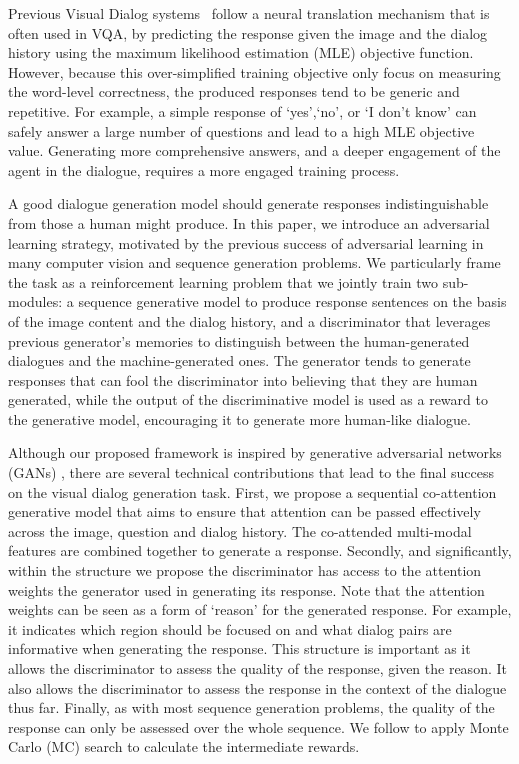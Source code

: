\documentclass[10pt,twocolumn,letterpaper]{article}
\begin{document}
Previous Visual Dialog systems~\cite{das2016visual} follow a neural translation mechanism that is often used in VQA, by predicting the response given the image and the dialog history using the maximum likelihood estimation (MLE) objective function. However, because this over-simplified training objective only focus on measuring the word-level correctness, the produced responses tend to be generic and repetitive. For example, a simple response of `yes',`no', or `I don't know' can safely answer a large number of questions and lead to a high MLE objective value.
Generating more comprehensive answers, and a deeper engagement of the agent in the dialogue, requires a more engaged training process.

A good dialogue generation model should generate responses indistinguishable from those a human might produce. In this paper, we introduce an adversarial learning strategy, 
motivated by the previous success of adversarial learning in many computer vision  \cite{chen2016infogan,radford2015unsupervised} and sequence generation \cite{dai2017towards, yu2017seqgan} problems. 
We particularly frame the task as
a reinforcement learning problem that we jointly train two sub-modules: a sequence generative model to produce response sentences on the basis of the image content and the dialog history, and a discriminator that leverages previous generator's memories to distinguish between the human-generated dialogues and the machine-generated ones. The generator tends to generate responses that can fool the discriminator into believing that they are human generated, while the output of the discriminative model is used as a reward to the generative model, encouraging it to generate more human-like dialogue.

Although our proposed framework is inspired by generative adversarial networks (GANs) \cite{goodfellow2014generative}, there are several technical contributions that lead to the final success on the visual dialog generation task. First, we propose a sequential co-attention generative model that aims to ensure that attention can be passed effectively across the image, question and dialog history. The co-attended multi-modal features are combined together to generate a response. Secondly, 
and significantly, within the structure we propose the discriminator has access to the attention weights the generator used in generating its response.
Note that the attention weights can be seen as a form of `reason' for the generated response. For example, it indicates which region should be focused on and what dialog pairs are informative when generating the response.
This structure is important as it allows the discriminator to assess the quality of the response, given the reason.  It also allows the discriminator to assess the response in the context of the dialogue thus far.
Finally, as with most sequence generation problems, the quality of the response can only be assessed over the whole sequence.
We follow \cite{yu2017seqgan} to apply Monte Carlo (MC) search to calculate the intermediate rewards.
\end{document}
